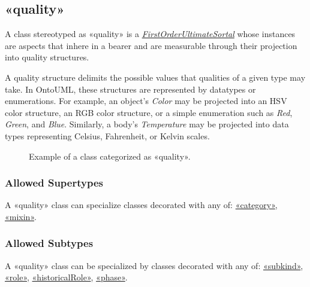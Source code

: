 

\subsection{«quality»}
\label{stereotype:quality}

A class stereotyped as «quality» is a \hyperref[stereotype:firstOrderUltimateSortal]{\textit{FirstOrderUltimateSortal}} whose instances are aspects that inhere in a bearer and are measurable through their projection into quality structures.

A quality structure delimits the possible values that qualities of a given type may take. In OntoUML, these structures are represented by datatypes or enumerations. For example, an object’s \textit{Color} may be projected into an HSV color structure, an RGB color structure, or a simple enumeration such as \textit{Red}, \textit{Green}, and \textit{Blue}. Similarly, a body’s \textit{Temperature} may be projected into data types representing Celsius, Fahrenheit, or Kelvin scales.


\begin{figure}[h]
    \centering
    
    \caption{Example of a class categorized as «quality».}
    \label{fig:quality-example}
\end{figure}

\subsubsection{Allowed Supertypes}

A «quality» class can specialize classes decorated with any of: 
\hyperref[stereotype:category]{«category»}, \hyperref[stereotype:mixin]{«mixin»}.

\subsubsection{Allowed Subtypes}

A «quality» class can be specialized by classes decorated with any of:
\hyperref[stereotype:subkind]{«subkind»}, \hyperref[stereotype:role]{«role»}, \hyperref[stereotype:historicalRole]{«historicalRole»}, \hyperref[stereotype:phase]{«phase»}.


